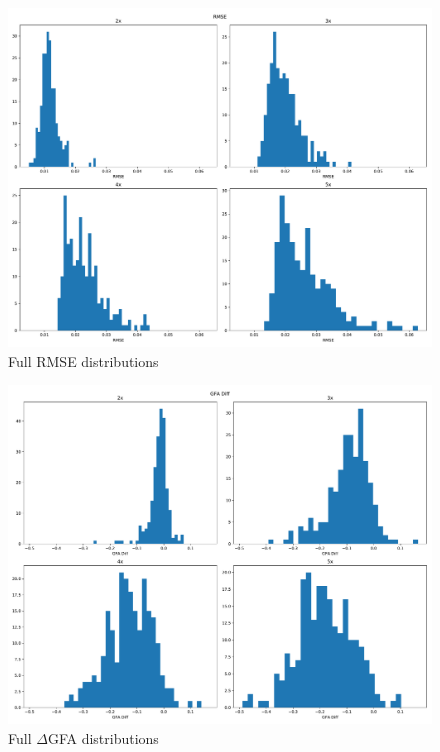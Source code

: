 \documentclass[11pt]{article}
\begin{document}
\begin{figure}[h]
  \centering
  \includegraphics[width=\linewidth]{../plots/RMSE}
  \caption{Full RMSE distributions}
  \label{fig:rmse}
\end{figure}

\begin{figure}[h]
  \centering
  \includegraphics[width=\linewidth]{../plots/GFA_Diff}
  \caption{Full $\Delta$GFA distributions}
  \label{fig:gfa}
\end{figure}
\end{document}
